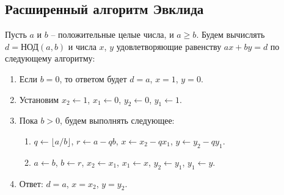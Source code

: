 \documentclass[12pt,a4paper]{report}
\def \jacobi #1#2{\left(\frac{#1}{#2}\right)}
\begin{document}
\subsection{Расширенный алгоритм Эвклида}

Пусть $a$ и $b$ -- положительные целые числа, и $a \geq b$.
Будем вычислять $d = \textrm{НОД}(a, b)$ и числа $x$, $y$ удовлетворяющие равенству $ax + by = d$ по следующему алгоритму:

\begin{enumerate}
\item Если $b = 0$, то ответом будет $d = a$, $x = 1$, $y = 0$.
\item Установим $x_2 \leftarrow 1$, $x_1 \leftarrow 0$, $y_2 \leftarrow 0$,
$y_1 \leftarrow 1$.
\item Пока $b > 0$, будем выполнять следующее:
\begin{enumerate}
\item $q \leftarrow \lfloor a / b \rfloor$, $r \leftarrow a - qb$,
$x \leftarrow x_2 - qx_1$, $y \leftarrow y_2 - qy_1$.
\item $a \leftarrow b$, $b \leftarrow r$, $x_2 \leftarrow x_1$,
$x_1 \leftarrow x$, $y_2 \leftarrow y_1$, $y_1 \leftarrow y$.
\end{enumerate}
\item Ответ: $d = a$, $x = x_2$, $y = y_2$.
\end{enumerate}

%


\end{document}
